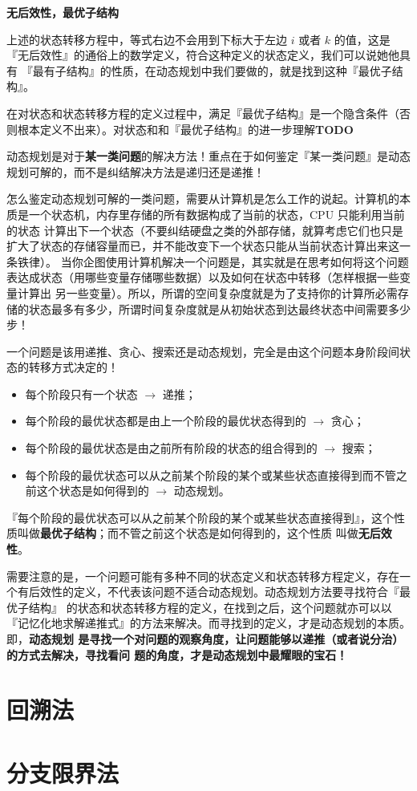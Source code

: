 \noindent\textbf{无后效性，最优子结构}

上述的状态转移方程中，等式右边不会用到下标大于左边 $i$ 或者 $k$ 的值，这是『无后效性』的通俗上的数学定义，符合这种定义的状态定义，我们可以说她他具有
『最有子结构』的性质，在动态规划中我们要做的，就是找到这种『最优子结构』。

在对状态和状态转移方程的定义过程中，满足『最优子结构』是一个隐含条件（否则根本定义不出来）。对状态和和『最优子结构』的进一步理解\textbf{TODO}

\begin{newnote}
动态规划是对于\textbf{某一类问题}的解决方法！重点在于如何鉴定『某一类问题』是动态规划可解的，而不是纠结解决方法是递归还是递推！

怎么鉴定动态规划可解的一类问题，需要从计算机是怎么工作的说起。计算机的本质是一个状态机，内存里存储的所有数据构成了当前的状态，CPU 只能利用当前的状态
计算出下一个状态（不要纠结硬盘之类的外部存储，就算考虑它们也只是扩大了状态的存储容量而已，并不能改变下一个状态只能从当前状态计算出来这一条铁律）。
当你企图使用计算机解决一个问题是，其实就是在思考如何将这个问题表达成状态（用哪些变量存储哪些数据）以及如何在状态中转移（怎样根据一些变量计算出
另一些变量）。所以，所谓的空间复杂度就是为了支持你的计算所必需存储的状态最多有多少，所谓时间复杂度就是从初始状态到达最终状态中间需要多少步！
\end{newnote}

一个问题是该用递推、贪心、搜索还是动态规划，完全是由这个问题本身阶段间状态的转移方式决定的！
\begin{itemize}
	\item 每个阶段只有一个状态 $\rightarrow$ 递推；
	\item 每个阶段的最优状态都是由上一个阶段的最优状态得到的 $\rightarrow$ 贪心；
	\item 每个阶段的最优状态是由之前所有阶段的状态的组合得到的 $\rightarrow$ 搜索；
	\item 每个阶段的最优状态可以从之前某个阶段的某个或某些状态直接得到而不管之前这个状态是如何得到的 $\rightarrow$ 动态规划。
\end{itemize}

『每个阶段的最优状态可以从之前某个阶段的某个或某些状态直接得到』，这个性质叫做\textbf{最优子结构}；而不管之前这个状态是如何得到的，这个性质
叫做\textbf{无后效性}。

需要注意的是，一个问题可能有多种不同的状态定义和状态转移方程定义，存在一个有后效性的定义，不代表该问题不适合动态规划。动态规划方法要寻找符合『最优子结构』
的状态和状态转移方程的定义，在找到之后，这个问题就亦可以以『记忆化地求解递推式』的方法来解决。而寻找到的定义，才是动态规划的本质。即，\textbf{动态规划
是寻找一个对问题的观察角度，让问题能够以递推（或者说分治）的方式去解决，寻找看问
题的角度，才是动态规划中最耀眼的宝石！}


\section{回溯法}\label{sec:back-tracking}



\section{分支限界法}\label{sec:branch-and-bound}




\endinput
